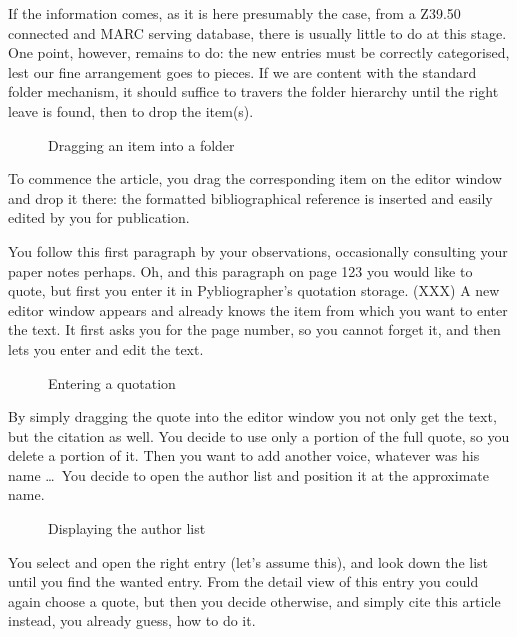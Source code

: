 If the information comes, as it is here presumably the case, from a
Z39.50 connected and MARC serving database, there is usually little to
do at this stage. One point, however, remains to do: the new entries
must be correctly categorised, lest our fine arrangement goes to
pieces. If we are content with the standard folder mechanism, it
should suffice to travers the folder hierarchy until the right leave
is found, then to drop the item(s).

\begin{figure}[h]
  
  \caption{Dragging an item into a folder}
  \label{fig:searchx5}
\end{figure}
 
To commence the article, you drag the corresponding item on the editor
window and drop it there: the formatted bibliographical reference is
inserted and easily edited by you for publication.

You follow this first paragraph by your observations, occasionally
consulting your paper notes perhaps. Oh, and this paragraph on page
123 you would like to quote, but first you enter it in Pybliographer's
quotation storage. (XXX) A new editor window appears and already knows
the item from which you want to enter the text. It first asks you for
the page number, so you cannot forget it, and then lets you enter and
edit the text. 

\begin{figure}[h]
  
  \caption{Entering a quotation}
  \label{fig:searchx6}
\end{figure}

By simply dragging the quote into the editor window you not only get
the text, but the citation as well. You decide to use only a portion
of the full quote, so you delete a portion of it. Then you want to add
another voice, whatever was his name \dots\ You decide to open the
author list and position it at the approximate name.

\begin{figure}[h]
  
  \caption{Displaying the author list}
  \label{fig:searchx7}
\end{figure}

You select and open the right entry (let's assume this), and
look down the list until you find the wanted entry. From the detail
view of this entry you could again choose a quote, but then you
decide otherwise, and simply cite this article instead, you already
guess, how to do it.

